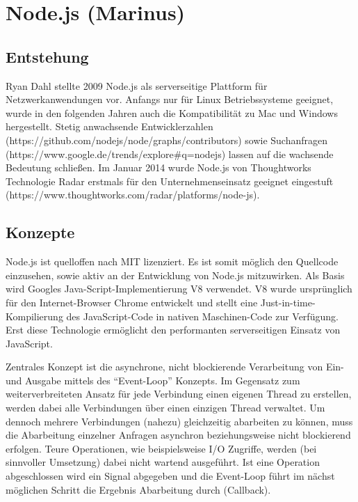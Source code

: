 \chapter{Node.js (Marinus)}\label{node.js-marinus}

\section{Entstehung}\label{entstehung}

Ryan Dahl stellte 2009 Node.js als serverseitige Plattform für
Netzwerkanwendungen vor. Anfangs nur für Linux Betriebssysteme geeignet,
wurde in den folgenden Jahren auch die Kompatibilität zu Mac und Windows
hergestellt. Stetig anwachsende Entwicklerzahlen
(https://github.com/nodejs/node/graphs/contributors) sowie Suchanfragen
(https://www.google.de/trends/explore\#q=nodejs) lassen auf die
wachsende Bedeutung schließen. Im Januar 2014 wurde Node.js von
Thoughtworks Technologie Radar erstmals für den Unternehmenseinsatz
geeignet eingestuft
(https://www.thoughtworks.com/radar/platforms/node-js).

\section{Konzepte}\label{konzepte-1}

Node.js ist quelloffen nach MIT lizenziert. Es ist somit möglich den
Quellcode einzusehen, sowie aktiv an der Entwicklung von Node.js
mitzuwirken. Als Basis wird Googles Java-Script-Implementierung V8
verwendet. V8 wurde ursprünglich für den Internet-Browser Chrome
entwickelt und stellt eine Just-in-time-Kompilierung des JavaScript-Code
in nativen Maschinen-Code zur Verfügung. Erst diese Technologie
ermöglicht den performanten serverseitigen Einsatz von JavaScript.

Zentrales Konzept ist die asynchrone, nicht blockierende Verarbeitung
von Ein- und Ausgabe mittels des ``Event-Loop'' Konzepts. Im Gegensatz
zum weiterverbreiteten Ansatz für jede Verbindung einen eigenen Thread
zu erstellen, werden dabei alle Verbindungen über einen einzigen Thread
verwaltet. Um dennoch mehrere Verbindungen (nahezu) gleichzeitig
abarbeiten zu können, muss die Abarbeitung einzelner Anfragen asynchron
beziehungsweise nicht blockierend erfolgen. Teure Operationen, wie
beispielsweise I/O Zugriffe, werden (bei sinnvoller Umsetzung) dabei
nicht wartend ausgeführt. Ist eine Operation abgeschlossen wird ein
Signal abgegeben und die Event-Loop führt im nächst möglichen Schritt
die Ergebnis Abarbeitung durch (Callback).

